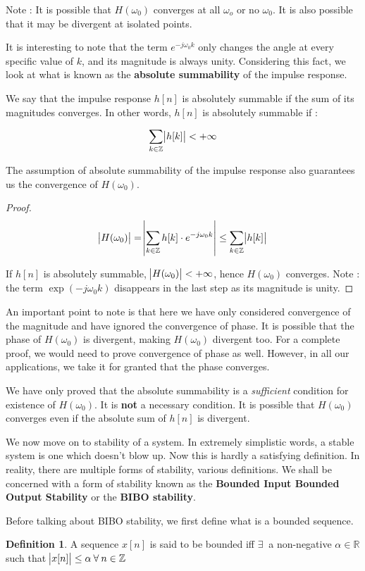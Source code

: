 \documentclass{article}
\theoremstyle{definition}
\newtheorem{defn}[theorem]{Definition}
\begin{document}
Note : It is possible that $H(\omega_0)$ converges at all $\omega_o$ or no $\omega_0$. It is also possible that it may be divergent at isolated points. 

It is interesting to note that the term $e^{-j\omega_0 k}$ only changes the angle at every specific value of $k$, and its magnitude is always unity. Considering this fact, we look at what is known as the \textbf{absolute summability} of the impulse response. \smallskip

We say that the impulse response $h[n]$ is absolutely summable if the sum of its magnitudes converges. In other words, $h[n]$ is absolutely summable if : 

\[
	\sum_{k \in \mathbb{Z}} \abs{h[k]} < +\infty 
\]

The assumption of absolute summability of the impulse response also guarantees us the convergence of $H(\omega_0)$. 
\begin{proof}
\[
	\abs{H(\omega_0)} = \abs{\sum_{k \in \mathbb{Z}} h[k]\cdot e^{-j\omega_0 k}} \leq \sum_{k \in \mathbb{Z}} \abs{h[k]}  
\]

If $h[n]$ is absolutely summable, $\abs{H(\omega_0)} < +\infty$, hence $H(\omega_0)$ converges. Note : the term $\exp(-j\omega_0 k)$ disappears in the last step as its magnitude is unity.
\end{proof}

An important point to note is that here we have only considered convergence of the magnitude and have ignored the convergence of phase. It is possible that the phase of $H(\omega_0)$ is divergent, making $H(\omega_0)$ divergent too. For a complete proof, we would need to prove convergence of phase as well. However, in all our applications, we take it for granted that the phase converges. \smallskip

We have only proved that the absolute summability is a \textit{sufficient} condition for existence of $H(\omega_0)$. It is \textbf{not} a necessary condition. It is possible that $H(\omega_0)$ converges even if the absolute sum of $h[n]$ is divergent. \smallskip

We now move on to stability of a system. In extremely simplistic words, a stable system is one which doesn't blow up. Now this is hardly a satisfying definition. In reality, there are multiple forms of stability, various definitions. We shall be concerned with a form of stability known as the \textbf{Bounded Input Bounded Output Stability} or the \textbf{BIBO stability}. \smallskip

Before talking about BIBO stability, we first define what is a bounded sequence. 
\begin{defn}
	A sequence $x[n]$ is said to be bounded iff $\exists \:$ a non-negative  $\alpha \in \mathbb{R}$ such that $\abs{x[n]} \leq \alpha\: \forall \: n \in \mathbb{Z}$
\end{defn}
\end{document}
